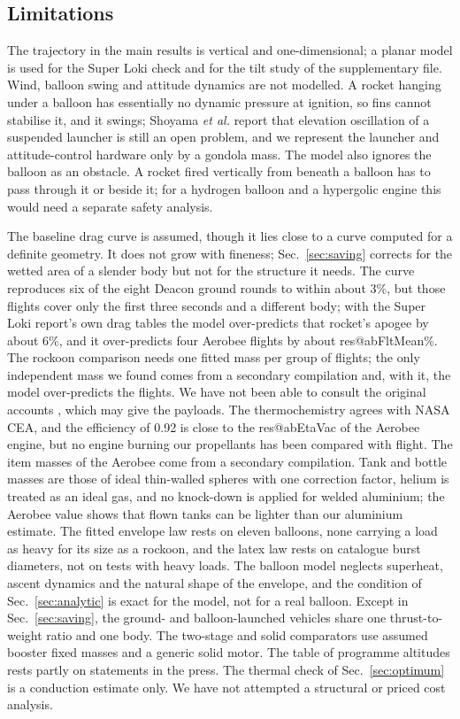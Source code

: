 \documentclass[11pt,a4paper]{article}
\makeatletter
\newcommand{\R}[1]{\csname res@#1\endcsname}
\makeatother
\begin{document}
\subsection{Limitations}

The trajectory in the main results is vertical and one-dimensional; a planar model is used for the Super Loki check and for the tilt study of the supplementary file. Wind, balloon swing and attitude dynamics are not modelled. A rocket hanging under a balloon has essentially no dynamic pressure at ignition, so fins cannot stabilise it, and it swings; Shoyama \emph{et al.} \cite{shoyama2026} report that elevation oscillation of a suspended launcher is still an open problem, and we represent the launcher and attitude-control hardware only by a gondola mass. The model also ignores the balloon as an obstacle. A rocket fired vertically from beneath a balloon has to pass through it or beside it; for a hydrogen balloon and a hypergolic engine this would need a separate safety analysis.

The baseline drag curve is assumed, though it lies close to a curve computed for a definite geometry. It does not grow with fineness; Sec.~\ref{sec:saving} corrects for the wetted area of a slender body but not for the structure it needs. The curve reproduces six of the eight Deacon ground rounds to within about 3\%, but those flights cover only the first three seconds and a different body; with the Super Loki report's own drag tables the model over-predicts that rocket's apogee by about 6\%, and it over-predicts four Aerobee flights by about \R{abFltMean}\%. The rockoon comparison needs one fitted mass per group of flights; the only independent mass we found comes from a secondary compilation and, with it, the model over-predicts the flights. We have not been able to consult the original accounts \cite{vanallen1954,vanallen1959}, which may give the payloads. The thermochemistry agrees with NASA CEA, and the efficiency of 0.92 is close to the \R{abEtaVac} of the Aerobee engine, but no engine burning our propellants has been compared with flight. The item masses of the Aerobee come from a secondary compilation. Tank and bottle masses are those of ideal thin-walled spheres with one correction factor, helium is treated as an ideal gas, and no knock-down is applied for welded aluminium; the Aerobee value shows that flown tanks can be lighter than our aluminium estimate. The fitted envelope law rests on eleven balloons, none carrying a load as heavy for its size as a rockoon, and the latex law rests on catalogue burst diameters, not on tests with heavy loads. The balloon model neglects superheat, ascent dynamics and the natural shape of the envelope, and the condition of Sec.~\ref{sec:analytic} is exact for the model, not for a real balloon. Except in Sec.~\ref{sec:saving}, the ground- and balloon-launched vehicles share one thrust-to-weight ratio and one body. The two-stage and solid comparators use assumed booster fixed masses and a generic solid motor. The table of programme altitudes rests partly on statements in the press. The thermal check of Sec.~\ref{sec:optimum} is a conduction estimate only. We have not attempted a structural or priced cost analysis.
\end{document}
